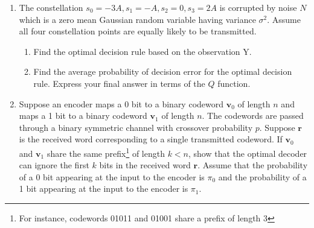 \documentclass[10pt]{report}
\begin{document}
\begin{enumerate}
  \item The constellation $s_0 = -3A, s_1 = -A, s_2 = 0, s_3 = 2A$ is corrupted by noise $N$ which is a zero mean Gaussian random variable having variance $\sigma^2$. Assume all four constellation points are equally likely to be transmitted. 
    \begin{enumerate}
      \item Find the optimal decision rule based on the observation Y.
      \item Find the average probability of decision error for the optimal decision rule. Express your final answer in terms of the $Q$ function.
    \end{enumerate}
    \begin{figure}[h]
      \centering
      \centering
    \end{figure}

  \item Suppose an encoder maps a 0 bit to a binary codeword $\mathbf{v}_0$ of length $n$ and maps a 1 bit to a binary codeword $\mathbf{v}_1$ of length $n$. The codewords are passed through a binary symmetric channel with crossover probability $p$. Suppose $\mathbf{r}$ is the received word corresponding to a single transmitted codeword. If $\mathbf{v}_0$ and $\mathbf{v}_1$ share the same prefix\footnote{For instance, codewords 01011 and 01001 share a prefix of length 3} of length $k < n$, show that the optimal decoder can ignore the first $k$ bits in the received word $\mathbf{r}$. Assume that the probability of a 0 bit appearing at the input to the encoder is $\pi_0$ and the probability of a 1 bit appearing at the input to the encoder is $\pi_1$.


\end{enumerate}
\end{document}
